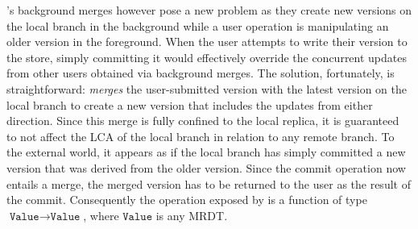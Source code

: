 \quark's background merges however pose a new problem as they create
new versions on the local branch in the background while a user
operation is manipulating an older version in the foreground. When
the user attempts to write their version to the store, simply
committing it would effectively override the concurrent updates from
other users obtained via background merges. The solution, fortunately,
is straightforward: \quark \emph{merges} the user-submitted version
with the latest version on the local branch to create a new version
that includes the updates from either direction. Since this merge is
fully confined to the local replica, it is guaranteed to not affect
the LCA of the local branch in relation to any remote branch. To the
external world, it appears as if the local branch has simply committed
a new version that was derived from the older version. Since the
commit operation now entails a merge, the merged version has to be
returned to the user as the result of the commit.  Consequently the
 operation exposed by \quark is a function of type
$\texttt{Value} \rightarrow \texttt{Value}$, where $\texttt{Value}$ is
any MRDT.
